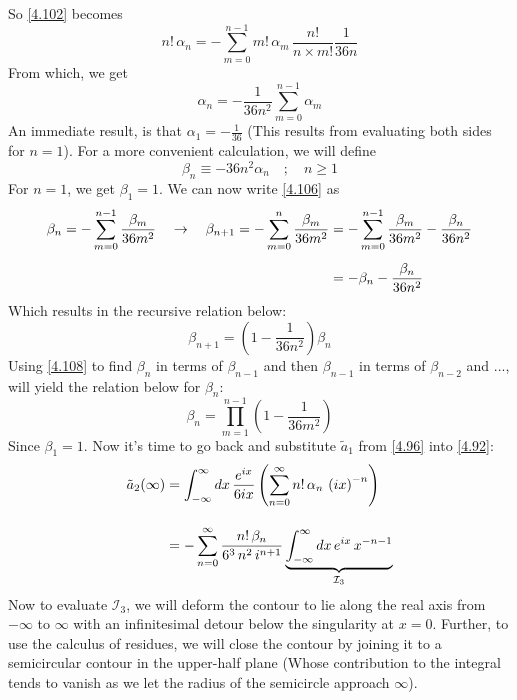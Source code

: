 \documentclass[12pt,a4paper]{article}
\begin{document}
	So \eqref{4.102} becomes
	\begin{equation}
		n!\, \alpha_{n} = -\sum_{m = 0}^{n-1} m!\, \alpha_{m}\, \dfrac{n!}{n \times m!} \frac{1}{36n} \label{4.104}
	\end{equation}
	From which, we get
	\begin{equation}
		\alpha_{n} = -\frac{1}{36n^{2}} \sum_{m = 0}^{n - 1} \alpha_{m} \label{4.105}
	\end{equation}
	An immediate result, is that $\alpha_{1} = -\frac{1}{36}$ (This results from evaluating both sides for $n = 1$). For a more convenient calculation, we will define
	\begin{equation}
		\beta_{n} \equiv -36n^{2} \alpha_{n} \quad ; \quad n \geq 1 \label{4.106}
	\end{equation}
	For $n = 1$, we get $\beta_{1} = 1$. We can now write \eqref{4.106} as
	\begin{align}
		\beta_{n} = -\sum_{m = 0}^{n - 1} \dfrac{\beta_{m}}{36m^{2}} \quad \rightarrow \quad \beta_{n+1} = -\sum_{m = 0}^{n} \dfrac{\beta_{m}}{36m^{2}} &= -\sum_{m = 0}^{n - 1} \dfrac{\beta_{m}}{36m^{2}} - \dfrac{\beta_{n}}{36n^{2}} \notag \\[5pt]
		&= -\beta_{n} - \dfrac{\beta_{n}}{36n^{2}} \label{4.107}
	\end{align}
	Which results in the recursive relation below:
	\begin{equation}
		\beta_{n+1} = \left( 1 - \frac{1}{36n^{2}} \right) \beta_{n} \label{4.108}
	\end{equation}
	Using \eqref{4.108} to find $\beta_{n}$ in terms of $\beta_{n-1}$ and then $\beta_{n-1}$ in terms of $\beta_{n-2}$ and ..., will yield the relation below for $\beta_{n}$:
	\begin{equation}
		\beta_{n} = \prod_{m = 1}^{n-1} \left( 1 - \frac{1}{36m^{2}} \right)
	\end{equation}
	Since $\beta_{1} = 1$. Now it's time to go back and substitute $\tilde{a}_{1}$ from \eqref{4.96} into \eqref{4.92}:
	\begin{align}
		\tilde{a}_{2}(\infty) &= \int_{-\infty}^{\infty} dx\, \frac{e^{ix}}{6ix} \left( \sum_{n = 0}^{\infty} n!\, \alpha_{n }\, \left( ix \right)^{-n} \right) \notag \\[10pt]
		&= -\sum_{n = 0}^{\infty} \dfrac{n!\, \beta_{n}}{6^{3}\, n^{2}\, i^{n+1}} \underbrace{\int_{-\infty}^{\infty} dx\, e^{ix}\, x^{-n-1}}_{\mathcal{I}_{3}} \label{4.110}
	\end{align}
	Now to evaluate $\mathcal{I}_{3}$, we will deform the contour to lie along the real axis from $-\infty$ to $\infty$ with an infinitesimal detour below the singularity at $x = 0$. Further, to use the calculus of residues, we will close the contour by joining it to a semicircular contour in the upper-half plane (Whose contribution to the integral tends to vanish as we let the radius of the semicircle approach $\infty$).
\end{document}
